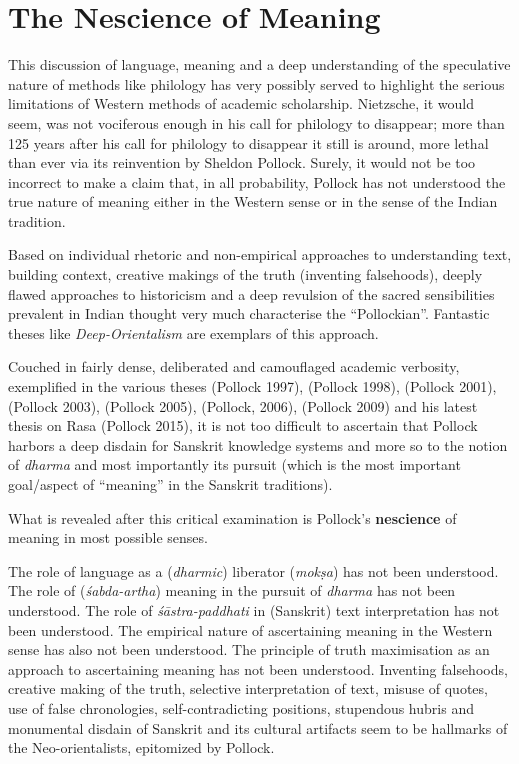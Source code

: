 \vskip -6pt


\section*{The Nescience of Meaning}

\vskip -6pt

This discussion of language, meaning and a deep understanding of the speculative nature of methods like philology has very possibly served to highlight the serious limitations of Western methods of academic scholarship. Nietzsche, it would seem, was not vociferous enough in his call for philology to disappear; more than 125 years after his call for philology to disappear it still is around, more lethal than ever via its reinvention by Sheldon Pollock. Surely, it would not be too incorrect to make a claim that, in all probability, Pollock has not understood the true nature of meaning either in the Western sense or in the sense of the Indian tradition.

Based on individual rhetoric and non-empirical approaches to understanding text, building context, creative makings of the truth (inventing falsehoods), deeply flawed approaches to historicism and a deep revulsion of the sacred sensibilities prevalent in Indian thought very much characterise the “Pollockian”. Fantastic theses like \textit{Deep-Orientalism} are exemplars of this approach.

Couched in fairly dense, deliberated and camouflaged academic verbosity, exemplified in the various theses (Pollock 1997), (Pollock 1998), (Pollock 2001),(Pollock 2003), (Pollock 2005), (Pollock, 2006), (Pollock 2009) and his latest thesis on Rasa (Pollock 2015), it is not too difficult to ascertain that Pollock harbors a deep disdain for Sanskrit knowledge systems and more so to the notion of \textit{dharma} and most importantly its pursuit (which is the most important goal/aspect of “meaning” in the Sanskrit traditions).

What is revealed after this critical examination is Pollock’s \textbf{nescience} of meaning in most possible senses.

The role of language as a (\textit{dharmic}) liberator (\textit{mokṣa}) has not been understood. The role of (\textit{śabda-artha}) meaning in the pursuit of \textit{dharma} has not been understood. The role of \textit{śāstra-paddhati} in (Sanskrit) text interpretation has not been understood. The empirical nature of ascertaining meaning in the Western sense has also not been understood. The principle of truth maximisation as an approach to ascertaining meaning has not been understood. Inventing falsehoods, creative making of the truth, selective interpretation of text, misuse of quotes, use of false chronologies, self-contradicting positions, stupendous hubris and monumental disdain of Sanskrit and its cultural artifacts seem to be hallmarks of the Neo-orientalists, epitomized by Pollock.



